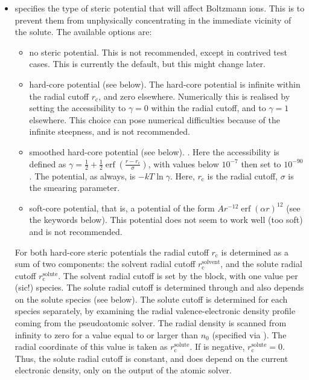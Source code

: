 \documentclass[letterpaper,10pt,english]{sphinxmanual}
\begin{document}
\begin{itemize}
\item {} 
 specifies the type of steric
potential that will affect Boltzmann ions. This is to prevent them
from unphysically concentrating in the immediate vicinity of the
solute. The available options are:
\begin{itemize}
\item {} 
 no steric potential. This is not recommended, except in
contrived test cases. This is currently the default, but this
might change later.

\item {} 
 hard-core potential (see below). The hard-core potential is
infinite within the radial cutoff \(r_{\textrm{c}}\), and zero
elsewhere. Numerically this is realised by setting the
accessibility to \(\gamma=0\) within the radial cutoff, and to
\(\gamma=1\) elsewhere. This choice can pose numerical
difficulties because of the infinite steepness, and is not
recommended.

\item {} 
 smoothed hard-core potential (see below). . Here the accessibility is defined as
\(\gamma=\frac{1}{2} + \frac{1}{2} \operatorname{erf}{(\frac{r-r_{\textrm{c}}}{\sigma})}\),
with values below \(10^{-7}\) then set to \(10^{-90}\).
The potential, as always, is \(-kT \ln{\gamma}\). Here,
\(r_{\textrm{c}}\) is the radial cutoff, \(\sigma\) is the
smearing parameter.

\item {} 
 soft-core potential, that is, a potential of the form
\(Ar^{-12}\operatorname{erf}{(\alpha{}r)}^{12}\) (see the
 keywords below). This potential does not seem to work
well (too soft) and is not recommended.

\end{itemize}

For both hard-core steric potentials the radial cutoff
\(r_{\textrm{c}}\) is determined as a sum of two components: the
solvent radial cutoff \(r_{\textrm{c}}^{\textrm{solvent}}\), and
the solute radial cutoff \(r_{\textrm{c}}^{\textrm{solute}}\).
The solvent radial cutoff is set by the 
block, with one value per  (sic!) species. The solute radial
cutoff is determined through  and also
depends on the solute species (see below). The solute cutoff is
determined for each species separately, by examining the radial
valence-electronic density profile coming from the pseudoatomic
solver. The radial density is scanned from infinity to zero for a
value equal to or larger than \(n_0\) (specified via
). The radial coordinate of this value
is taken as \(r_{\textrm{c}}^{\textrm{solute}}\). If
 is negative,
\(r_{\textrm{c}}^{\textrm{solute}}=0\). Thus, the solute radial
cutoff is constant, and does depend on the current electronic
density, only on the output of the atomic solver.


\end{itemize}
\end{document}
